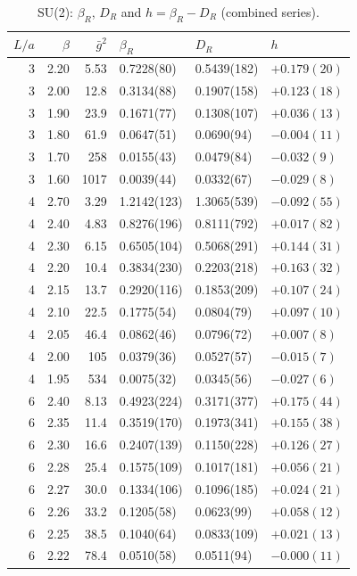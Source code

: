\documentclass[11pt,a4paper]{article}
\theoremstyle{definition}
\theoremstyle{remark}
\newcommand{\gb}{\bar g^{2}}
\newcommand{\bR}{\beta_R}
\newcommand{\DR}{D_R}
\begin{document}
\begin{table}[tp]\centering\small
\caption{SU(2): $\bR$, $\DR$ and $h=\bR-\DR$ (combined series).}\label{tab:su2}
\begin{tabular}{@{}rrrlll@{}}\toprule
$L/a$ & $\beta$ & $\gb$ & $\bR$ & $\DR$ & $h$\\\midrule
3 & 2.20 & 5.53 & 0.7228(80) & 0.5439(182) & $+0.179(20)$\\
3 & 2.00 & 12.8 & 0.3134(88) & 0.1907(158) & $+0.123(18)$\\
3 & 1.90 & 23.9 & 0.1671(77) & 0.1308(107) & $+0.036(13)$\\
3 & 1.80 & 61.9 & 0.0647(51) & 0.0690(94) & $-0.004(11)$\\
3 & 1.70 & 258 & 0.0155(43) & 0.0479(84) & $-0.032(9)$\\
3 & 1.60 & 1017 & 0.0039(44) & 0.0332(67) & $-0.029(8)$\\\midrule
4 & 2.70 & 3.29 & 1.2142(123) & 1.3065(539) & $-0.092(55)$\\
4 & 2.40 & 4.83 & 0.8276(196) & 0.8111(792) & $+0.017(82)$\\
4 & 2.30 & 6.15 & 0.6505(104) & 0.5068(291) & $+0.144(31)$\\
4 & 2.20 & 10.4 & 0.3834(230) & 0.2203(218) & $+0.163(32)$\\
4 & 2.15 & 13.7 & 0.2920(116) & 0.1853(209) & $+0.107(24)$\\
4 & 2.10 & 22.5 & 0.1775(54) & 0.0804(79) & $+0.097(10)$\\
4 & 2.05 & 46.4 & 0.0862(46) & 0.0796(72) & $+0.007(8)$\\
4 & 2.00 & 105 & 0.0379(36) & 0.0527(57) & $-0.015(7)$\\
4 & 1.95 & 534 & 0.0075(32) & 0.0345(56) & $-0.027(6)$\\\midrule
6 & 2.40 & 8.13 & 0.4923(224) & 0.3171(377) & $+0.175(44)$\\
6 & 2.35 & 11.4 & 0.3519(170) & 0.1973(341) & $+0.155(38)$\\
6 & 2.30 & 16.6 & 0.2407(139) & 0.1150(228) & $+0.126(27)$\\
6 & 2.28 & 25.4 & 0.1575(109) & 0.1017(181) & $+0.056(21)$\\
6 & 2.27 & 30.0 & 0.1334(106) & 0.1096(185) & $+0.024(21)$\\
6 & 2.26 & 33.2 & 0.1205(58) & 0.0623(99) & $+0.058(12)$\\
6 & 2.25 & 38.5 & 0.1040(64) & 0.0833(109) & $+0.021(13)$\\
6 & 2.22 & 78.4 & 0.0510(58) & 0.0511(94) & $-0.000(11)$\\

\end{tabular}
\end{table}
\end{document}
